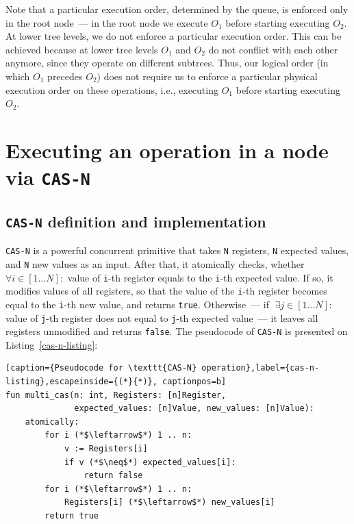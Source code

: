 \documentclass[times, dvipsnames,%
               languages={russian,english} %
              ]{itmo-student-thesis}
\begin{document}
Note that a particular execution order, determined by the queue, is enforced only in the root node~--- in the root node we execute $O_1$ before starting executing $O_2$. At lower tree levels, we do not enforce a particular execution order. This can be achieved because at lower tree levels $O_1$ and $O_2$ do not conflict with each other anymore, since they operate on different subtrees. Thus, our logical order (in which $O_1$ precedes $O_2$) does not require us to enforce a particular physical execution order on these operations, i.e., executing $O_1$ before starting executing $O_2$.

\section{Executing an operation in a node via \texttt{CAS-N}}
\label{casn-section}

\subsection{\texttt{CAS-N} definition and implementation}
\label{cas-n-definition}

\texttt{CAS-N} is a powerful concurrent primitive that takes \texttt{N} registers, \texttt{N} expected values, and \texttt{N} new values as an input. After that, it atomically checks, whether $\forall i \in [1 \ldots N] : $ value of \texttt{i}-th register equals to the \texttt{i}-th expected value. If so, it modifies values of all registers, so that the value of the \texttt{i}-th register becomes equal to the \texttt{i}-th new value, and returns \texttt{true}. Otherwise~--- if $\; \exists j \in [1 \ldots N] : $ value of \texttt{j}-th register does not equal to \texttt{j}-th expected value~--- it leaves all registers unmodified and returns \texttt{false}. The pseudocode of \texttt{CAS-N} is presented on Listing~\ref{cas-n-listing}:

\renewcommand{\lstlistingname}{Listing}
\begin{lstlisting}[caption={Pseudocode for \texttt{CAS-N} operation},label={cas-n-listing},escapeinside={(*}{*)}, captionpos=b]
fun multi_cas(n: int, Registers: [n]Register,
              expected_values: [n]Value, new_values: [n]Value):
    atomically:
        for i (*$\leftarrow$*) 1 .. n:
            v := Registers[i]
            if v (*$\neq$*) expected_values[i]:
                return false
        for i (*$\leftarrow$*) 1 .. n:
            Registers[i] (*$\leftarrow$*) new_values[i]
        return true
\end{lstlisting}
\end{document}

